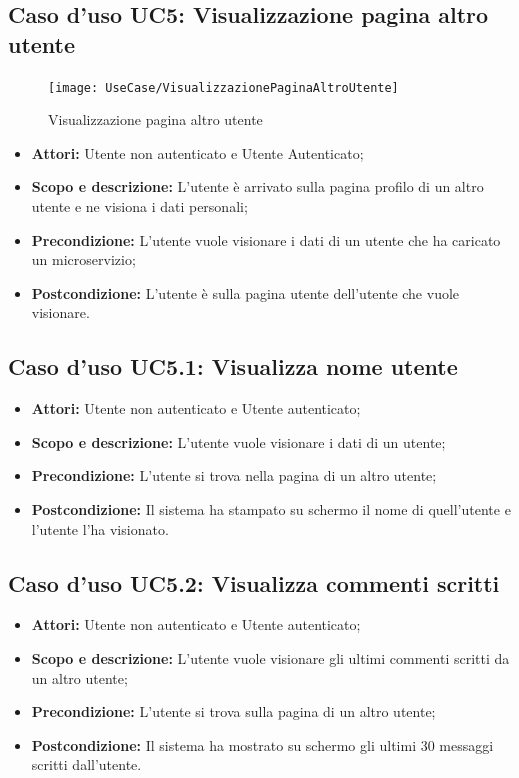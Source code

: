 \documentclass[12pt,a4paper,titlepage]{article}
\begin{document}
\subsection{Caso d'uso UC5: Visualizzazione pagina altro utente}
\begin{figure}[H]
	\centering
	\texttt{[image: UseCase/VisualizzazionePaginaAltroUtente]}
	\caption{Visualizzazione pagina altro utente}
\end{figure}
\begin{itemize}
	\item \textbf{Attori: }Utente non autenticato e Utente Autenticato;
	\item \textbf{Scopo e descrizione: }L'utente è arrivato sulla pagina profilo di un altro utente e ne visiona i dati personali;
	\item \textbf{Precondizione: }L'utente vuole visionare i dati di un utente che ha caricato un microservizio;
	\item \textbf{Postcondizione: }L'utente è sulla pagina utente dell'utente che vuole visionare.
\end{itemize}
\subsection{Caso d'uso UC5.1: Visualizza nome utente}
\begin{itemize}
	\item \textbf{Attori: }Utente non autenticato e Utente autenticato;
	\item \textbf{Scopo e descrizione: }L'utente vuole visionare i dati di un utente;
	\item \textbf{Precondizione: }L'utente si trova nella pagina di un altro utente;
	\item \textbf{Postcondizione: }Il sistema ha stampato su schermo il nome di quell'utente e l'utente l'ha visionato.
\end{itemize}
\subsection{Caso d'uso UC5.2: Visualizza commenti scritti}
\begin{itemize}
	\item \textbf{Attori: }Utente non autenticato e Utente autenticato;
	\item \textbf{Scopo e descrizione: }L'utente vuole visionare gli ultimi commenti scritti da un altro utente;
	\item \textbf{Precondizione: }L'utente si trova sulla pagina di un altro utente;
	\item \textbf{Postcondizione: }Il sistema ha mostrato su schermo gli ultimi 30 messaggi scritti dall'utente.
\end{itemize}
\end{document}
